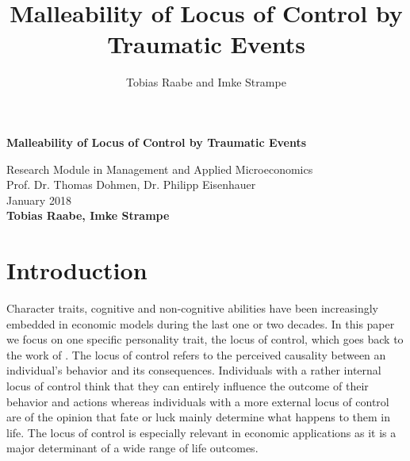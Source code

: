 \documentclass[12pt, a4paper, fleqn, parskip]{scrartcl}
\author{Tobias Raabe and Imke Strampe}
\title{Malleability of Locus of Control by Traumatic Events}
\begin{document}
    \begin{titlepage}
        \begin{center}
            \vspace*{35mm}
            {\bfseries\Large{Malleability of Locus of Control by Traumatic Events}\\
            \vspace{25mm}}
            \begin{spacing}{1.3}
                \large Research Module in Management and Applied Microeconomics\\
                \vspace{65mm}
               Prof. Dr. Thomas Dohmen, Dr. Philipp Eisenhauer \\
                \vspace{10mm}
                January 2018   \\
                \textbf{Tobias Raabe, Imke Strampe} \\
            \end{spacing}
        \end{center}
    \end{titlepage}

\tableofcontents

\pagebreak

\listoffigures  {} \clearpage
\listoftables  {} \clearpage

\pagebreak


\section{Introduction}
\label{sec:introduction}

Character traits, cognitive and non-cognitive abilities have been increasingly embedded
in economic models during the last one or two decades. In this paper we focus on one
specific personality trait, the locus of control, which goes back to the work of
\citet{rotter1966}. The locus of control refers to the perceived causality between an
individual's behavior and its consequences. Individuals with a rather internal locus of
control think that they can entirely influence the outcome of their behavior and actions
whereas individuals with a more external locus of control are of the opinion that fate
or luck mainly determine what happens to them in life. The locus of control is
especially relevant in economic applications as it is a major determinant of a wide
range of life outcomes.
\end{document}
